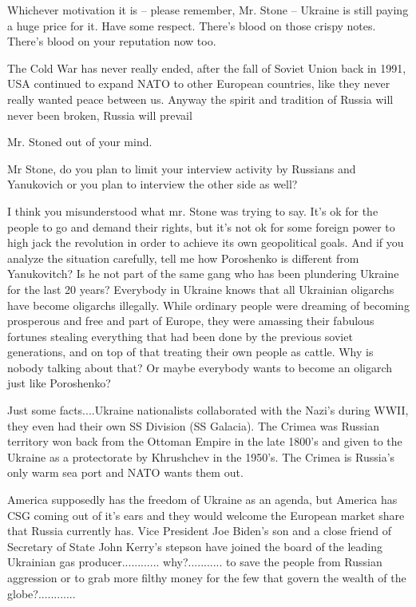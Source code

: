 \begin{itemize}
Whichever motivation it is – please remember, Mr. Stone – Ukraine is still
paying a huge price for it. Have some respect. There’s blood on those crispy
notes. There's blood on your reputation now too.


The Cold War has never really ended, after the fall of Soviet Union back in
1991, USA continued to expand NATO to other European countries, like they never
really wanted peace between us. Anyway the spirit and tradition of Russia will
never been broken, Russia will prevail

Mr. Stoned out of your mind.

Mr Stone, do you plan to limit your interview activity by Russians and Yanukovich or you plan to interview the other side as well?


I think you misunderstood what mr. Stone was trying to say. It's ok for the
people to go and demand their rights, but it's not ok for some foreign power to
high jack the revolution in order to achieve its own geopolitical goals. And if
you analyze the situation carefully, tell me how Poroshenko is different from
Yanukovitch? Is he not part of the same gang who has been plundering Ukraine
for the last 20 years? Everybody in Ukraine knows that all Ukrainian oligarchs
have become oligarchs illegally. While ordinary people were dreaming of
becoming prosperous and free and part of Europe, they were amassing their
fabulous fortunes stealing everything that had been done by the previous soviet
generations, and on top of that treating their own people as cattle. Why is
nobody talking about that? Or maybe everybody wants to become an oligarch just
like Poroshenko?


Just some facts....Ukraine nationalists collaborated with
the Nazi’s during WWII, they even had their own SS Division (SS Galacia).
The Crimea was Russian territory won back from the Ottoman
Empire in the late 1800’s and given to the Ukraine as a protectorate by Khrushchev in the 1950’s.
The Crimea is Russia’s only warm sea port and NATO wants
them out.

America supposedly has the freedom of Ukraine as an agenda,
but America has CSG coming out of it’s ears and they would welcome the European market share that Russia currently has.
Vice President Joe Biden's son and a close friend of Secretary of State John Kerry's stepson have joined the board of the leading Ukrainian gas producer............ why?........... to save the people from Russian aggression or to grab more filthy money for the few that govern the wealth of the globe?............


\end{itemize}
